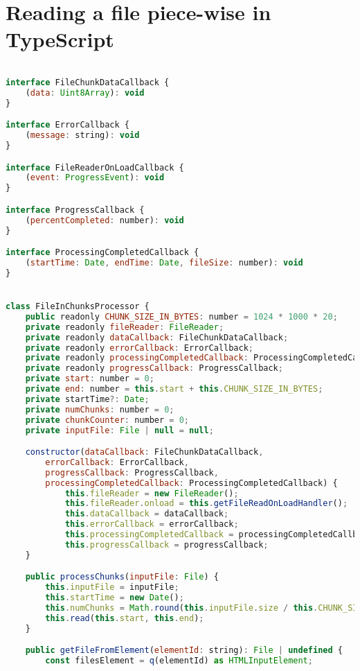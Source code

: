\section{Reading a file piece-wise in TypeScript}
\begin{lstlisting}[language=Javascript]

interface FileChunkDataCallback {
    (data: Uint8Array): void
}

interface ErrorCallback {
    (message: string): void
}

interface FileReaderOnLoadCallback {
    (event: ProgressEvent): void
}

interface ProgressCallback {
    (percentCompleted: number): void
}

interface ProcessingCompletedCallback {
    (startTime: Date, endTime: Date, fileSize: number): void
}


class FileInChunksProcessor {
    public readonly CHUNK_SIZE_IN_BYTES: number = 1024 * 1000 * 20;
    private readonly fileReader: FileReader;
    private readonly dataCallback: FileChunkDataCallback;
    private readonly errorCallback: ErrorCallback;
    private readonly processingCompletedCallback: ProcessingCompletedCallback;
    private readonly progressCallback: ProgressCallback;
    private start: number = 0;
    private end: number = this.start + this.CHUNK_SIZE_IN_BYTES;
    private startTime?: Date;
    private numChunks: number = 0;
    private chunkCounter: number = 0;
    private inputFile: File | null = null;

    constructor(dataCallback: FileChunkDataCallback,
        errorCallback: ErrorCallback,
        progressCallback: ProgressCallback,
        processingCompletedCallback: ProcessingCompletedCallback) {
            this.fileReader = new FileReader();
            this.fileReader.onload = this.getFileReadOnLoadHandler();
            this.dataCallback = dataCallback;
            this.errorCallback = errorCallback;
            this.processingCompletedCallback = processingCompletedCallback;
            this.progressCallback = progressCallback;
    }

    public processChunks(inputFile: File) {
        this.inputFile = inputFile;
        this.startTime = new Date();
        this.numChunks = Math.round(this.inputFile.size / this.CHUNK_SIZE_IN_BYTES);
        this.read(this.start, this.end);
    }

    public getFileFromElement(elementId: string): File | undefined {
        const filesElement = q(elementId) as HTMLInputElement;


\end{lstlisting}
